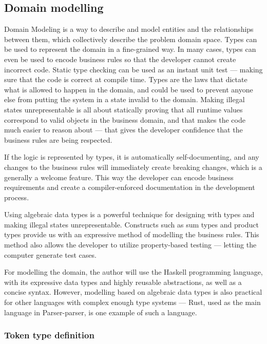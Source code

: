 \documentclass[english,engineering]{wizthesis}
\newcommand{\paraphrase}[1]{#1}
\newcommand{\thisproject}{Parser-parser}
\begin{document}
\subsection{Domain modelling} \label{sbs:domain-modelling}

\paraphrase{Domain Modeling is a way to describe and model entities and the
relationships between them, which collectively describe the problem domain
space. Types can be used to represent the domain in a fine-grained way. In many
cases, types can even be used to encode business rules so that the developer
cannot create incorrect code. Static type checking can be used as an instant
unit test --- making sure that the code is correct at compile time. Types are
the laws that dictate what is allowed to happen in the domain, and could be used
to prevent anyone else from putting the system in a state invalid to the domain.
Making illegal states unrepresentable is all about statically proving that all
runtime values correspond to valid objects in the business domain, and that
makes the code much easier to reason about --- that gives the developer
confidence that the business rules are being respected.}

\paraphrase{If the logic is represented by types, it is automatically
self-documenting, and any changes to the business rules will immediately create
breaking changes, which is a generally a welcome feature. This way the developer
can encode business requirements and create a compiler-enforced documentation in
the development process.}

Using algebraic data types is a powerful technique for designing with types and
making illegal states unrepresentable. Constructs such as sum types and product
types provide us with an expressive method of modelling the business rules.
This method also allows the developer to utilize property-based testing ---
letting the computer generate test cases.

For modelling the domain, the author will use the Haskell programming language,
with its expressive data types and highly reusable abstractions, as well as a
concise syntax. However, modelling based on algebraic data types is also
practical for other languages with complex enough type systems --- Rust, used as
the main language in \thisproject{}, is one example of such a language.

\subsubsection*{Token type definition}
\end{document}
